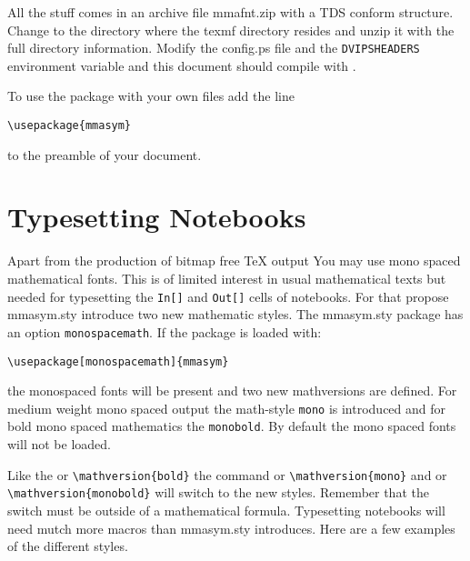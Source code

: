 \documentclass{article}
\begin{document}
All the stuff comes in an archive file \textsf{mmafnt.zip}
with a TDS conform structure. Change to the directory where the
\textsf{texmf} directory resides and unzip it with the full directory
information. Modify the \textsf{config.ps} file and 
the \texttt{DVIPSHEADERS} environment variable and this document
should compile with \LaTeXe.

To use the package with your own files add the line
\begin{verbatim}
\usepackage{mmasym}
\end{verbatim}
%
to the preamble of your \LaTeXe{} document.


\section{Typesetting \MathLogo{} Notebooks}

Apart from the production of bitmap free \TeX{} output You may use
mono spaced mathematical fonts. This is of limited interest
in usual mathematical texts but needed  for typesetting the \texttt{In[]} and
\texttt{Out[]} cells of \MathLogo{} notebooks.
For that propose \textsf{mmasym.sty} introduce two new mathematic styles.
The \textsf{mmasym.sty} package has an option \texttt{monospacemath}.
If the package is loaded with:

\begin{verbatim}
\usepackage[monospacemath]{mmasym}
\end{verbatim}

the monospaced fonts will be present and two new mathversions are defined.
For medium weight mono spaced output the math-style \texttt{mono} is 
introduced and for bold mono spaced mathematics the \texttt{monobold}.
By default the mono spaced fonts will not be loaded.
\begin{sloppypar}
Like the  or \verb|\mathversion{bold}| the command
 or \verb|\mathversion{mono}| and 
or \verb|\mathversion{monobold}| will switch to the new styles. Remember
that the switch must be outside of a mathematical formula.
Typesetting notebooks will need mutch more macros than \textsf{mmasym.sty}
introduces. Here are a few examples	of the different styles.
\end{sloppypar}

\def\half{{1\over 2}}
\end{document}

